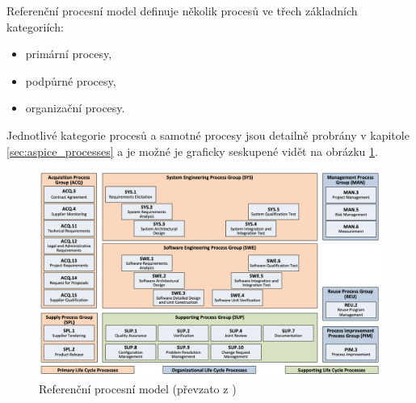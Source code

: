 \documentclass[czech,master]{diploma}
\begin{document}
Referenční procesní model definuje několik procesů ve třech základních kategoriích:

\begin{itemize}

\item primární procesy,
\item podpůrné procesy,
\item organizační procesy.

\end{itemize}

Jednotlivé kategorie procesů a samotné procesy jsou detailně probrány v kapitole \ref{sec:aspice_processes} a je možné je graficky seskupené vidět na obrázku \ref{fig:prm}.
\begin{figure}[!ht]
    \centering
    \includegraphics[width=1\textwidth]{Diplomka/Figures/prm.png}
    \caption{Referenční procesní model (převzato z \cite{ref:aspice_download_prm})}
    \label{fig:prm}
\end{figure}



\end{document}
